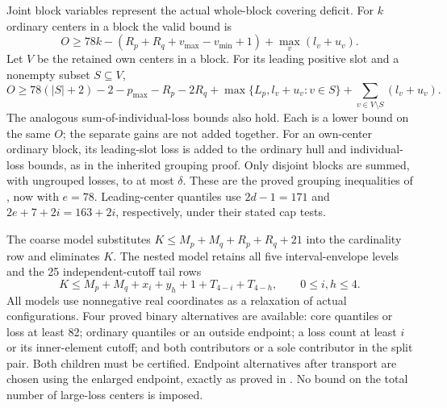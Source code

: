 \documentclass[11pt,a4paper]{article}
\begin{document}
Joint block variables represent the actual whole-block covering deficit.
For $k$ ordinary centers in a block the valid bound is
\[
 O\ge78k-(R_p+R_q+v_{\max}-v_{\min}+1)+\max_v(l_v+u_v).
\]
Let $V$ be the retained own centers in a block. For its leading positive
slot and a nonempty subset $S\subseteq V$,
\[
 O\ge78(|S|+2)-2-p_{\max}-R_p-2R_q
       +\max\{L_p,l_v+u_v:v\in S\}
       +\sum_{v\in V\setminus S}(l_v+u_v).
\]
The analogous sum-of-individual-loss bounds also hold. Each is a
lower bound on the same $O$; the separate gains are not added together.
For an own-center ordinary block, its leading-slot loss is added to the
ordinary hull and individual-loss bounds, as in the inherited grouping proof.
Only disjoint blocks are summed, with ungrouped losses, to at most
$\delta$. These are the proved grouping inequalities of \cite{overlap},
now with $e=78$. Leading-center quantiles use $2d-1=171$ and
$2e+7+2i=163+2i$, respectively, under their stated cap tests.

The coarse model substitutes $K\le M_p+M_q+R_p+R_q+21$ into the
cardinality row and eliminates $K$. The nested model retains all five
interval-envelope levels and the 25 independent-cutoff tail rows
\[
 K\le M_p+M_q+x_i+y_h+1+T_{4-i}+T_{4-h},\qquad0\le i,h\le4.
\]
All models use nonnegative real coordinates as a relaxation of actual
configurations. Four proved binary alternatives are available: core
quantiles or loss at least 82; ordinary quantiles or an outside endpoint;
a loss count at least $i$ or its inner-element cutoff; and both
contributors or a sole contributor in the split pair. Both children
must be certified. Endpoint alternatives after transport are chosen
using the enlarged endpoint, exactly as proved in \cite{previous}.
No bound on the total number of large-loss centers is imposed.
\end{document}
